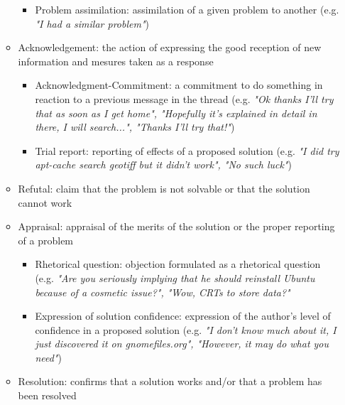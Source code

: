 \documentclass[11pt]{article}
\begin{document}
\begin{itemize}
\begin{itemize}
\begin{itemize}
					\item Problem assimilation: assimilation of a given problem to another (e.g. \textit{"I had a similar problem"})
				\end{itemize}
			\item Acknowledgement: the action of expressing the good reception of new information and mesures taken as a response
				\begin{itemize}
					\item Acknowledgment-Commitment: a commitment to do something in reaction to a previous message in the thread (e.g. \textit{"Ok thanks I'll try that as soon as I get home", "Hopefully it's explained in detail in there, I will search...", "Thanks I'll try that!"})
					\item Trial report: reporting of effects of a proposed solution (e.g. \textit{"I did try apt-cache search geotiff but it didn't work", "No such luck"})
				\end{itemize}
			\item Refutal: claim that the problem is not solvable or that the solution cannot work
			\item Appraisal: appraisal of the merits of the solution or the proper reporting of a problem
				\begin{itemize}
					\item Rhetorical question: objection formulated as a rhetorical question (e.g. \textit{"Are you seriously implying that he should reinstall Ubuntu because of a cosmetic issue?", "Wow, CRTs to store data?"}
					\item Expression of solution confidence: expression of the author's level of confidence in a proposed solution (e.g. \textit{"I don't know much about it, I just discovered it on gnomefiles.org", "However, it may do what you need"})
				\end{itemize}
			\item Resolution: confirms that a solution works and/or that a problem has been resolved
		\end{itemize}
\end{itemize}



\end{document}
